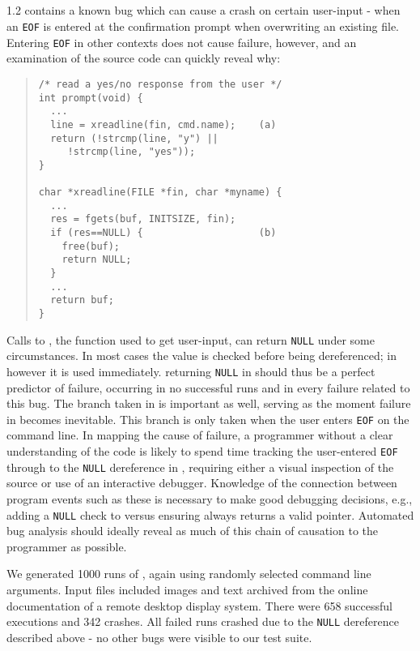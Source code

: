 \subsection{\large\textbf{}}
\label{sec-ccrypt}
 1.2 contains a known bug which can cause a crash on certain user-input - when an \texttt{EOF} is entered at the confirmation prompt when overwriting an existing file.  Entering \texttt{EOF} in other contexts does not cause failure, however, and an examination of the source code can quickly reveal why:
\begin{quote}
\begin{verbatim}
/* read a yes/no response from the user */
int prompt(void) {
  ...
  line = xreadline(fin, cmd.name);    (a)
  return (!strcmp(line, "y") ||
     !strcmp(line, "yes"));
}

char *xreadline(FILE *fin, char *myname) {
  ...
  res = fgets(buf, INITSIZE, fin);
  if (res==NULL) {                    (b)
    free(buf);
    return NULL;
  }
  ...
  return buf;
}

\end{verbatim}
\end{quote}
Calls to , the function used to get user-input, can return \texttt{NULL} under some circumstances.  In most cases the value is checked before being dereferenced; in  however it is used immediately.   returning \texttt{NULL} in  should thus be a perfect predictor of failure, occurring in no successful runs and in every failure related to this bug.  The branch taken in  is important as well, serving as the moment failure in  becomes inevitable.  This branch is only taken when the user enters \texttt{EOF} on the command line.  In mapping the cause of failure, a programmer without a clear understanding of the code is likely to spend time tracking the user-entered \texttt{EOF} through  to the \texttt{NULL} dereference in , requiring either a visual inspection of the source or use of an interactive debugger.  Knowledge of the connection between program events such as these is necessary to make good debugging decisions, e.g., adding a \texttt{NULL} check to  versus ensuring  always returns a valid pointer.  Automated bug analysis should ideally reveal as much of this chain of causation to the programmer as possible.

We generated 1000 runs of , again using randomly selected command line arguments.  Input files included images and text archived from the online documentation of a remote desktop display system.  There were 658 successful executions and 342 crashes.  All failed runs crashed due to the \texttt{NULL} dereference described above - no other bugs were visible to our test suite.

